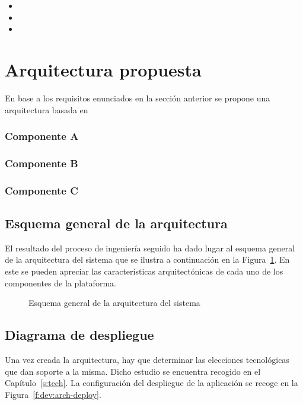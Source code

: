 \begin{itemize}
\item 
\item 
\item 
\end{itemize}

\section{Arquitectura propuesta}
\label{s:dev:arch}
En base a los requisitos enunciados en la sección anterior se propone una arquitectura basada en 

\subsubsection*{Componente A}


\subsubsection*{Componente B}


\subsubsection*{Componente C}



\subsection{Esquema general de la arquitectura}
El resultado del proceso de ingeniería seguido ha dado lugar al esquema general de la arquitectura del sistema que se ilustra a continuación en la Figura~\ref{f:dev:arch}. En este se pueden apreciar las características arquitectónicas de cada uno de los componentes de la plataforma.

\begin{figure}[h!]
\centering
\caption{Esquema general de la arquitectura del sistema}
\label{f:dev:arch}
\end{figure}


\subsection{Diagrama de despliegue}
Una vez creada la arquitectura, hay que determinar las elecciones tecnológicas que dan soporte a la misma. Dicho estudio se encuentra recogido en el Capítulo~\ref{s:tech}. La configuración del despliegue de la aplicación se recoge en la Figura~\ref{f:dev:arch-deploy}.

